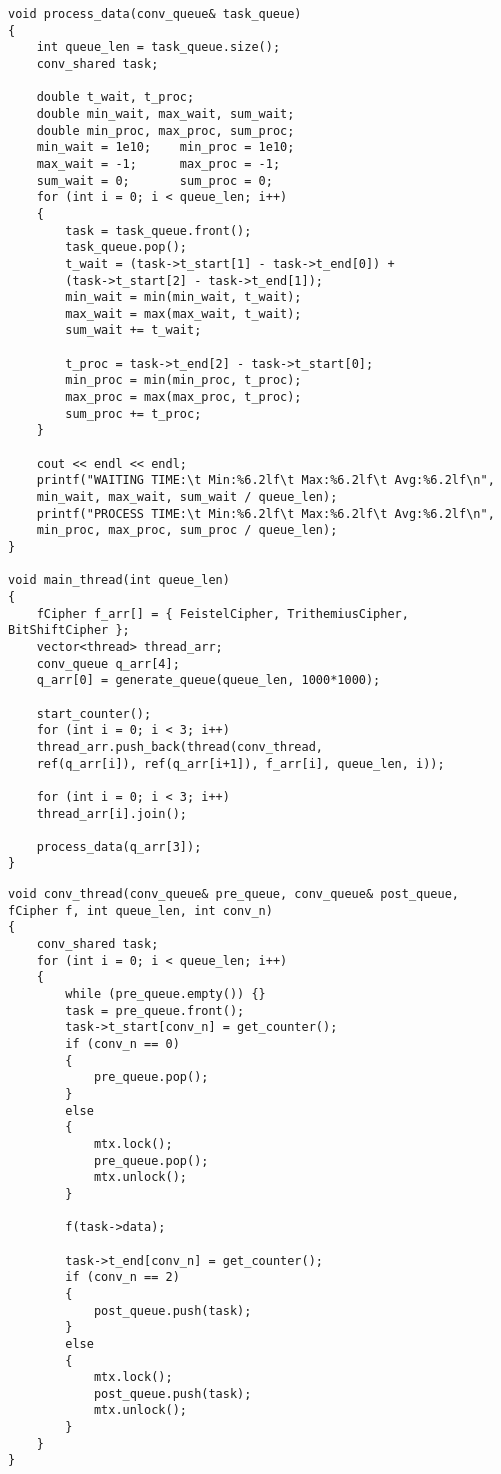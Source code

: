 \begin{lstlisting}[caption = {Функция основного потока (конвейера)}]
void process_data(conv_queue& task_queue)
{
	int queue_len = task_queue.size();
	conv_shared task;
	
	double t_wait, t_proc;
	double min_wait, max_wait, sum_wait;
	double min_proc, max_proc, sum_proc;
	min_wait = 1e10;    min_proc = 1e10;
	max_wait = -1;      max_proc = -1;
	sum_wait = 0;       sum_proc = 0;
	for (int i = 0; i < queue_len; i++)
	{
		task = task_queue.front();
		task_queue.pop();
		t_wait = (task->t_start[1] - task->t_end[0]) + 
		(task->t_start[2] - task->t_end[1]);
		min_wait = min(min_wait, t_wait);
		max_wait = max(max_wait, t_wait);
		sum_wait += t_wait;
		
		t_proc = task->t_end[2] - task->t_start[0];
		min_proc = min(min_proc, t_proc);
		max_proc = max(max_proc, t_proc);
		sum_proc += t_proc;
	}
	
	cout << endl << endl;
	printf("WAITING TIME:\t Min:%6.2lf\t Max:%6.2lf\t Avg:%6.2lf\n",
	min_wait, max_wait, sum_wait / queue_len);
	printf("PROCESS TIME:\t Min:%6.2lf\t Max:%6.2lf\t Avg:%6.2lf\n",
	min_proc, max_proc, sum_proc / queue_len);
}

void main_thread(int queue_len)
{
	fCipher f_arr[] = { FeistelCipher, TrithemiusCipher, BitShiftCipher };
	vector<thread> thread_arr;
	conv_queue q_arr[4];
	q_arr[0] = generate_queue(queue_len, 1000*1000);
	
	start_counter();
	for (int i = 0; i < 3; i++)
	thread_arr.push_back(thread(conv_thread,
	ref(q_arr[i]), ref(q_arr[i+1]), f_arr[i], queue_len, i));
	
	for (int i = 0; i < 3; i++)
	thread_arr[i].join();
	
	process_data(q_arr[3]);
}
\end{lstlisting}

\begin{lstlisting}[caption = {Функция рабочего потока (ленты)}]
void conv_thread(conv_queue& pre_queue, conv_queue& post_queue, fCipher f, int queue_len, int conv_n)
{
	conv_shared task;
	for (int i = 0; i < queue_len; i++)
	{
		while (pre_queue.empty()) {}
		task = pre_queue.front();
		task->t_start[conv_n] = get_counter();
		if (conv_n == 0)
		{
			pre_queue.pop();
		}
		else 
		{
			mtx.lock();
			pre_queue.pop();
			mtx.unlock();
		}
		
		f(task->data);
		
		task->t_end[conv_n] = get_counter();
		if (conv_n == 2)
		{
			post_queue.push(task);
		}
		else
		{
			mtx.lock();
			post_queue.push(task);
			mtx.unlock();
		}
	}
}
\end{lstlisting}


